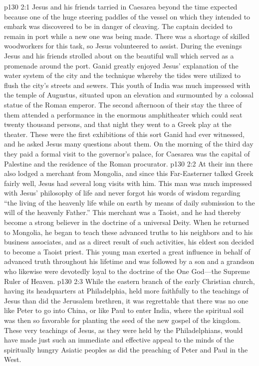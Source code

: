 \vs p130 2:1 Jesus and his friends tarried in Caesarea beyond the time expected because one of the huge steering paddles of the vessel on which they intended to embark was discovered to be in danger of cleaving. The captain decided to remain in port while a new one was being made. There was a shortage of skilled woodworkers for this task, so Jesus volunteered to assist. During the evenings Jesus and his friends strolled about on the beautiful wall which served as a promenade around the port. Ganid greatly enjoyed Jesus’ explanation of the water system of the city and the technique whereby the tides were utilized to flush the city’s streets and sewers. This youth of India was much impressed with the temple of Augustus, situated upon an elevation and surmounted by a colossal statue of the Roman emperor. The second afternoon of their stay the three of them attended a performance in the enormous amphitheater which could seat twenty thousand persons, and that night they went to a Greek play at the theater. These were the first exhibitions of this sort Ganid had ever witnessed, and he asked Jesus many questions about them. On the morning of the third day they paid a formal visit to the governor’s palace, for Caesarea was the capital of Palestine and the residence of the Roman procurator.
\pc \vs p130 2:2 At their inn there also lodged a merchant from Mongolia, and since this Far\hyp{}Easterner talked Greek fairly well, Jesus had several long visits with him. This man was much impressed with Jesus’ philosophy of life and never forgot his words of wisdom regarding “the living of the heavenly life while on earth by means of daily submission to the will of the heavenly Father.” This merchant was a Taoist, and he had thereby become a strong believer in the doctrine of a universal Deity. When he returned to Mongolia, he began to teach these advanced truths to his neighbors and to his business associates, and as a direct result of such activities, his eldest son decided to become a Taoist priest. This young man exerted a great influence in behalf of advanced truth throughout his lifetime and was followed by a son and a grandson who likewise were devotedly loyal to the doctrine of the One God---the Supreme Ruler of Heaven.
\vs p130 2:3 While the eastern branch of the early Christian church, having its headquarters at Philadelphia, held more faithfully to the teachings of Jesus than did the Jerusalem brethren, it was regrettable that there was no one like Peter to go into China, or like Paul to enter India, where the spiritual soil was then so favorable for planting the seed of the new gospel of the kingdom. These very teachings of Jesus, as they were held by the Philadelphians, would have made just such an immediate and effective appeal to the minds of the spiritually hungry Asiatic peoples as did the preaching of Peter and Paul in the West.
